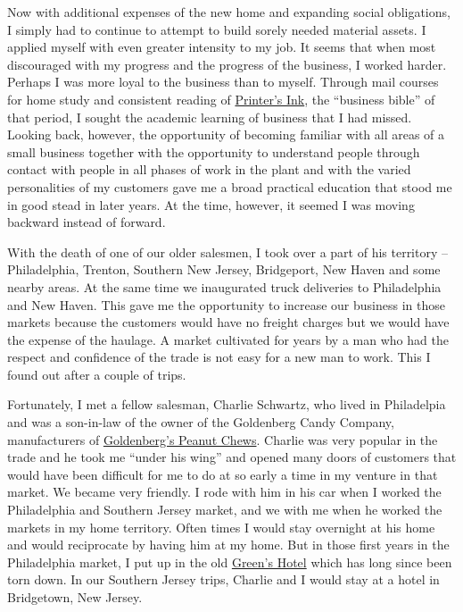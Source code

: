 \documentclass[12pt]{book}              %
\begin{document}
Now with additional expenses of the new home and expanding social obligations, I simply had to continue to attempt to build sorely needed material assets. I applied myself with even greater intensity to my job. It seems that when most discouraged with my progress and the progress of the business, I worked harder. Perhaps I was more loyal to the business than to myself. Through mail courses for home study and consistent reading of \href{http://en.wikipedia.org/wiki/Printer's_Ink}{Printer's Ink}, the ``business bible'' of that period, I sought the academic learning of business that I had missed. Looking back, however, the opportunity of becoming familiar with all areas of a small business together with the opportunity to understand people through contact with people in all phases of work in the plant and with the varied personalities of my customers gave me a broad practical education that stood me in good stead in later years. At the time, however, it seemed I was moving backward instead of forward. 

With the death of one of our older salesmen, I took over a part of his territory -- Philadelphia, Trenton, Southern New Jersey, Bridgeport, New Haven and some nearby areas. At the same time we inaugurated truck deliveries to Philadelphia and New Haven. This gave me the opportunity to increase our business in those markets because the customers would have no freight charges but we would have the expense of the haulage. A market cultivated for years by a man who had the respect and confidence of the trade is not easy for a new man to work. This I found out after a couple of trips. 

Fortunately, I met a fellow salesman, Charlie Schwartz, who lived in Philadelpia and was a son-in-law of the owner of the Goldenberg Candy Company, manufacturers of \href{http://en.wikipedia.org/wiki/Goldenberg's_Peanut_Chews}{Goldenberg's Peanut Chews}. Charlie was very popular in the trade and he took me ``under his wing'' and opened many doors of customers that would have been difficult for me to do at so early a time in my venture in that market. We became very friendly. I rode with him in his car when I worked the Philadelphia and Southern Jersey market, and we with me when he worked the markets in my home territory. Often times I would stay overnight at his home and would reciprocate by having him at my home. But in those first years in the Philadelphia market, I put  up in the old \href{http://digitalcollections.nypl.org/items/510d47da-550b-a3d9-e040-e00a18064a99}{Green's Hotel} which has long since been torn down. In our Southern Jersey trips, Charlie and I would stay at a hotel in Bridgetown, New Jersey. 
\end{document}
